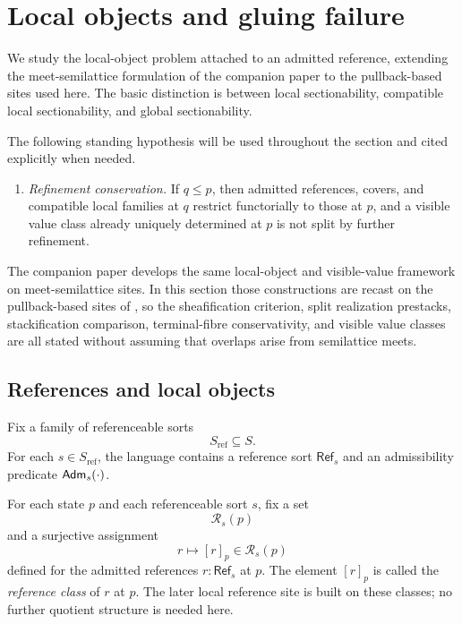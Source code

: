 \section{Local objects and gluing failure}\label{sec:null-decomposition}

We study the local-object problem attached to an admitted reference, extending the meet-semilattice formulation of the companion paper \cite{MaZhang2026ConditionalGluingFailure} to the pullback-based sites used here. The basic distinction is between local sectionability, compatible local sectionability, and global sectionability.

The following standing hypothesis will be used throughout the section and cited explicitly when needed.

\begin{enumerate}[label=\textup{(RC)},nosep,leftmargin=3em]
\item\label{hyp:refinement-conservation} \emph{Refinement conservation.} If $q\le p$, then admitted references, covers, and compatible local families at $q$ restrict functorially to those at $p$, and a visible value class already uniquely determined at $p$ is not split by further refinement.
\end{enumerate}

\begin{remark}
The companion paper \cite{MaZhang2026ConditionalGluingFailure} develops the same local-object and visible-value framework on meet-semilattice sites. In this section those constructions are recast on the pullback-based sites of , so the sheafification criterion, split realization prestacks, stackification comparison, terminal-fibre conservativity, and visible value classes are all stated without assuming that overlaps arise from semilattice meets.
\end{remark}

\subsection{References and local objects}

Fix a family of referenceable sorts
\[
S_{\mathrm{ref}}\subseteq S.
\]
For each $s\in S_{\mathrm{ref}}$, the language contains a reference sort $\mathsf{Ref}_s$ and an admissibility predicate $\mathsf{Adm}_s(\cdot)$.

\begin{definition}\label{def:reference-classes}
For each state $p$ and each referenceable sort $s$, fix a set
\[
\mathcal R_s(p)
\]
and a surjective assignment
\[
r\longmapsto [r]_p\in \mathcal R_s(p)
\]
defined for the admitted references $r:\mathsf{Ref}_s$ at $p$. The element $[r]_p$ is called the \emph{reference class} of $r$ at $p$. The later local reference site is built on these classes; no further quotient structure is needed here.
\end{definition}

